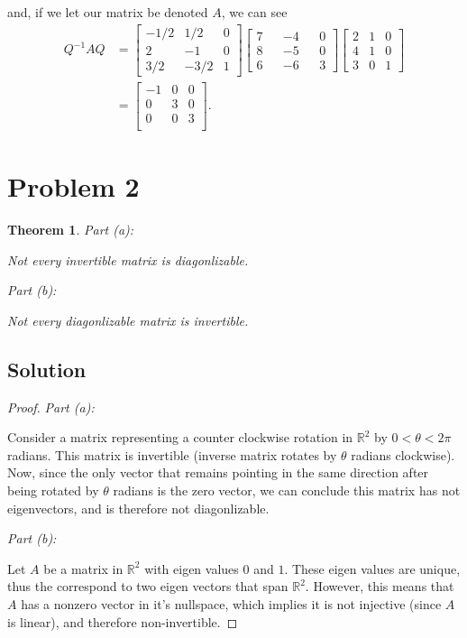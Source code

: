 \documentclass[10pt,a4paper]{article}
\makeatletter
\newtheorem{theorem}{Theorem}
\newcommand{\proofpart}[2]{%
  \par
  \addvspace{\medskipamount}%
  \noindent\emph{Part #1: #2}\par\nobreak
  \addvspace{\smallskipamount}%
  \@afterheading
}
\theoremstyle{definition}
\makeatother
\begin{document}
and, if we let our matrix be denoted $A$, we can see
\begin{align*}
Q^{-1} A Q &= 
\begin{bmatrix}
-1/2 & 1/2 & 0\\
2 & -1 & 0\\
3/2 & -3/2 & 1
\end{bmatrix}\begin{bmatrix}
7 && -4 && 0\\
8 && -5 && 0\\
6 && -6 && 3
\end{bmatrix} \begin{bmatrix}
2 & 1 & 0\\
4 & 1 & 0\\
3 & 0 & 1
\end{bmatrix}   \\
&= \begin{bmatrix}
-1 & 0 & 0\\
0 & 3 & 0\\
0 & 0 & 3\\
\end{bmatrix}.
\end{align*}

\section*{Problem 2}
\begin{theorem}
\proofpart{(a)}{} Not every invertible matrix is diagonlizable.
\proofpart{(b)}{} Not every diagonlizable matrix is invertible.
\end{theorem}

\subsection*{Solution}
\begin{proof}
\proofpart{(a)}{} Consider a matrix representing a counter clockwise rotation in $\mathbb{R}^2$ by $0 < \theta < 2 \pi$ radians. This matrix is invertible (inverse matrix rotates by $\theta$ radians clockwise). Now, since the only vector that remains pointing in the same direction after being rotated by $\theta$ radians is the zero vector, we can conclude this matrix has not eigenvectors, and is therefore not diagonlizable.

\proofpart{(b)}{} Let $A$ be a matrix in $\mathbb{R}^2$ with eigen values $0$ and $1$. These eigen values are unique, thus the correspond to two eigen vectors that span $\mathbb{R}^2$. However, this means that $A$ has a nonzero vector in it's nullspace, which implies it is not injective (since $A$ is linear), and therefore non-invertible.
\end{proof}
\end{document}
